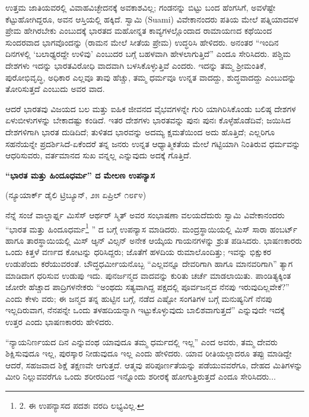 ಉತ್ತಮ ಜಾತಿಯವರಲ್ಲಿ ವಿವಾಹವಿಚ್ಛೇದನಕ್ಕೆ ಅವಕಾಶವಿಲ್ಲ; ಗಂಡನನ್ನು ಬಿಟ್ಟು ಬಂದ ಹೆಂಗಸಿಗೆ, ಅವಳೆಷ್ಟೇ ಕೆಟ್ಟುಹೋಗಿದ್ದರೂ, ಅವನ ಆಸ್ತಿಯಲ್ಲಿ ಹಕ್ಕಿದೆ. ಸ್ವಾಮಿ (Suami) ವಿವೇಕಾನಂದರು ಪತಿಯ ಮೇಲೆ ಪತ್ನಿಯಾದವಳ ಪ್ರೇಮ ಹೇಗಿರಬೇಕು ಎಂಬುದಕ್ಕೆ ಭಾರತದ ಮಹೋನ್ನತ ಕಾವ್ಯಗಳಲ್ಲೊಂದಾದ ರಾಮಾಯಣದ ಕಥೆಯಿಂದ ಸುಂದರವಾದ ಭಾಗವೊಂದನ್ನು (ರಾಮನ ಮೇಲೆ ಸೀತೆಯ ಪ್ರೇಮ) ಉದ್ಧರಿಸಿ ಹೇಳಿದರು. ಅನಂತರ “ಇಂದಿನ ದಿನಗಳಲ್ಲಿ ‘ಬಲಾಢ್ಯರದ್ದೇ ಉಳಿವು’ ಎಂಬುದರ ಬಗ್ಗೆ ಬಹಳವಾಗಿ ಹೇಳಲಾಗುತ್ತಿದೆ” ಎಂದೂ ಸೇರಿಸಿದರು. ಪಶ್ಚಿಮ ದೇಶಗಳು ಇದನ್ನು ಭಾರತವಿರೋಧಿ ವಾದವಾಗಿ ಬಳಸಿಕೊಳ್ಳುತ್ತಿವೆ ಎಂದರು. ಇದನ್ನು ತಮ್ಮ ಶ‍್ರೀಮಂತಿಕೆ, ಪುರೋಭಿವೃದ್ಧಿ, ಅಧಿಕಾರ ಎಲ್ಲವೂ ತಾವು ಹೆಚ್ಚು, ತಮ್ಮ ಧರ್ಮವೂ ಉನ್ನತ ವಾದದ್ದು, ಶುದ್ಧವಾದದ್ದು ಎಂಬುದನ್ನು ತೋರಿಸುತ್ತದೆ ಎಂಬುದು ಅವರ ವಾದ.

ಆದರೆ ಭಾರತವು ವಿಜಯದ ಬಲ ಮತ್ತು ಐಹಿಕ ಜೀವನದ ವೈಭವಗಳನ್ನೇ ಗುರಿ ಯಾಗಿರಿಸಿಕೊಂಡು ಬಲಿಷ್ಠ ದೇಶಗಳ ಏಳುಬೀಳುಗಳನ್ನು ಬೇಕಾದಷ್ಟು ಕಂಡಿದೆ. ಇತರ ದೇಶಗಳು ಭಾರತವನ್ನು ಪುನಃ ಪುನಃ ಕೊಳ್ಳೆಹೊಡೆದಿವೆ; ಜಯಿಸಿದ ದೇಶಗಳಿಗಾಗಿ ಭಾರತ ದುಡಿದಿದೆ; ತುಳಿತದ ಭಾರವನ್ನು ಅದಮ್ಯ ಕ್ಷಮತೆಯಿಂದ ಅದು ಹೊತ್ತಿದೆ; ಎಲ್ಲರಿಗೂ ಸಹನೆಯನ್ನೇ ಪ್ರದರ್ಶಿಸಿದೆ-ಏಕೆಂದರೆ ತನ್ನ ಜನರು ಉನ್ನತ ಆಧ್ಯಾತ್ಮಿಕತೆಯ ಮೇಲೆ ಗಟ್ಟಿಯಾಗಿ ನಿಂತಿರುವ ಧರ್ಮವನ್ನು ಆಧರಿಸುವರು, ವರ್ತಮಾನದ ಸುಖ ವನ್ನಲ್ಲ ಎನ್ನುವುದು ಅದಕ್ಕೆ ಗೊತ್ತಿದೆ.

\begin{center}
\textbf{“ಭಾರತ ಮತ್ತು ಹಿಂದೂಧರ್ಮ” ದ ಮೇಲಣ ಉಪನ್ಯಾಸ}
\end{center}

\begin{center}
(ನ್ಯೂಯಾರ್ಕ್ ಡೈಲಿ ಟ್ರಿಬ್ಯೂನ್, ೨೫ ಏಪ್ರಿಲ್ ೧೮೯೪)
\end{center}

ನೆನ್ನೆ ಸಂಜೆ ವಾಲ್ಡಾರ್ಫ್ನ ಮಿಸೆಸ್ ಆರ್ಥರ್ ಸ್ಮಿತ್ ಅವರ ಸಂಭಾಷಣಾ ವಲಯದೆದುರು ಸ್ವಾಮಿ ವಿವೇಕಾನಂದರು “ಭಾರತ ಮತ್ತು ಹಿಂದೂಧರ್ಮ\footnote{2. ಈ ಉಪನ್ಯಾಸದ ಪದಶಃ ವರದಿ ಲಭ್ಯವಿಲ್ಲ.} ” ದ ಬಗ್ಗೆ ಉಪನ್ಯಾಸ ಮಾಡಿದರು. ಮಂದ್ರಸ್ಥಾಯಿಯಲ್ಲಿ ಮಿಸ್ ಸಾರಾ ಹಂಬರ್ಟ್ ಹಾಗೂ ತಾರಸ್ಥಾಯಿಯಲ್ಲಿ ಮಿಸ್ ಆ್ಯನ್ ವಿಲ್ಸನ್ ಅನೇಕ ಆಯ್ಕೆಯ ಗಾಯನಗಳನ್ನು ಶ್ರುತ ಪಡಿಸಿದರು. ಭಾಷಣಕಾರರು ಒಂದು ಕಿತ್ತಳೆ ವರ್ಣದ ಕೋಟನ್ನು ಧರಿಸಿದ್ದರು; ಜೊತೆಗೆ ಹಳದಿಯ ರುಮಾಲೊಂದಿತ್ತು; ಇವನ್ನು ಭಿಕ್ಷುಕರ ಉಡುಪೆಂದು ಕರೆಯುವರಂತೆ. ಬೌದ್ಧಧರ್ಮೀಯನೊಬ್ಬ “ಎಲ್ಲವನ್ನೂ ದೇವರಿಗಾಗಿ ಹಾಗೂ ಮಾನವರಿಗಾಗಿ” ತ್ಯಾಗ ಮಾಡಿದಾಗ ಧರಿಸುವ ಉಡುಪು ಇದು. ಪುನರ್ಜನ್ಮದ ವಾದವನ್ನು ಕುರಿತು ಚರ್ಚೆ ಮಾಡಲಾಯಿತು. ಪಾಂಡಿತ್ಯಕ್ಕಿಂತ ಜೋರೇ ಹೆಚ್ಚಾದ ಪಾದ್ರಿಗಳನೇಕರು “ಅಂಥದು ಸತ್ಯವಾಗಿದ್ದ ಪಕ್ಷದಲ್ಲಿ ಪೂರ್ವಜನ್ಮದ ನೆನಪು ಇರುವುದಿಲ್ಲವೇಕೆ?” ಎಂದು ಕೇಳು ವರು; ಈ ಜನ್ಮದ ತನ್ನ ಹುಟ್ಟಿನ ಬಗ್ಗೆ, ನಡೆದ ಎಷ್ಟೋ ಸಂಗತಿಗಳ ಬಗ್ಗೆ ಮನುಷ್ಯನಿಗೆ ನೆನಪು ಇಲ್ಲದಿರುವಾಗ, ನೆನಪನ್ನೇ ಒಂದು ತಳಹದಿಯನ್ನಾಗಿ ಇಟ್ಟುಕೊಳ್ಳುವುದು ಬಾಲಿಶವಾಗುತ್ತದೆ” ಎನ್ನುವುದೇ ಇದಕ್ಕೆ ಉತ್ತರ ಎಂದು ಭಾಷಣಕಾರರು ಹೇಳಿದರು.

“ನ್ಯಾಯನಿರ್ಣಯದ ದಿನ ಎನ್ನುವಂಥ ಯಾವುದೂ ತಮ್ಮ ಧರ್ಮದಲ್ಲಿ ಇಲ್ಲ” ಎಂದ ಅವರು, ತಮ್ಮ ದೇವರು ಶಿಕ್ಷಿಸುವುದೂ ಇಲ್ಲ, ಪುರಸ್ಕಾರ ನೀಡುವುದೂ ಇಲ್ಲ ಎಂದು ಹೇಳಿದರು. ಯಾವ ರೀತಿಯಲ್ಲಾದರೂ ತಪ್ಪು ಮಾಡಿದ್ದೇ ಆದರೆ, ಸಹಜವಾದ ಶಿಕ್ಷೆ ತಕ್ಷಣವೇ ಆಗುತ್ತದೆ. ಆತ್ಮವು ಪರಿಪೂರ್ಣತೆಯನ್ನು ಪಡೆಯುವವರೆಗೂ, ದೇಹದ ಮಿತಿಗಳನ್ನು ಮೀರಿ ನಿಲ್ಲುವವರೆಗೂ ಒಂದು ಶರೀರದಿಂದ ಇನ್ನೊಂದು ಶರೀರಕ್ಕೆ ಹೋಗುತ್ತಿರುತ್ತದೆ ಎಂದೂ ಸೇರಿಸಿದರು...

